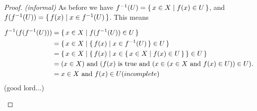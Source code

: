 \documentclass[../../main.tex]{subfiles}
\begin{document}
\begin{enumerate}
        \begin{ans}
            
        \end{ans}
            
        \begin{proof}
            \emph{(informal)}
            As before we have $f^{-1}(U) = \{\,x \in X\mid f(x) \in U\,\}$, and $f(f^{-1}(U)) = \{\,f(x)\mid x \in f^{-1}(U)\,\}$. This means
            \begin{xx}
                \begin{align*}
                    f^{-1}(f(f^{-1}(U))) 
                    &= \{\,x \in X\mid f(f^{-1}(U)) \in U\,\}\\
                    &= \{\,x \in X\mid\{\,f(x)\mid x \in f^{-1}(U)\,\} \in U\,\}\\
                    &= \{\,x \in X\mid\{\,f(x)\mid x \in \{\,x \in X\mid f(x) \in U\,\}\,\}\in U\,\}\\
                    &= (x \in X) \textnormal{ and } (f(x) \textnormal{ is true and } (x \in (x \in X \textnormal{ and } f(x) \in U))\in U). \\
                    &= x \in X \textnormal{ and } f(x) \in U (incomplete)
                \end{align*}
                (good lord...)
            \end{xx}
        \end{proof}
\end{enumerate}
\end{document}
